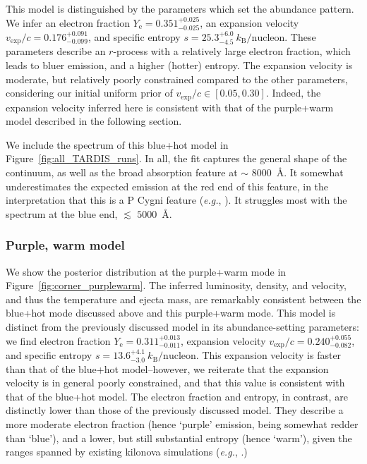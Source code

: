 \documentclass[twocolumn, twocolappendix]{aastex63}
\def\eg{{\it e.g.}}
\begin{document}
This model is distinguished by the parameters which set the abundance pattern. We infer an electron fraction $Y_{\mathrm{e}} = 0.351^{+0.025}_{-0.025}$, an expansion velocity $v_{\mathrm{exp}}/c = 0.176^{+0.091}_{-0.099}$, and specific entropy $s = 25.3^{+6.0}_{-4.5}~k_{\mathrm{B}}/\mathrm{nucleon}$. These parameters describe an $r$-process with a relatively large electron fraction, which leads to bluer emission, and a higher (hotter) entropy. The expansion velocity is moderate, but relatively poorly constrained compared to the other parameters, considering our initial uniform prior of $v_{\mathrm{exp}}/c \in [0.05, 0.30]$. Indeed, the expansion velocity inferred here is consistent with that of the purple+warm model described in the following section.

We include the spectrum of this blue+hot model in Figure~\ref{fig:all_TARDIS_runs}. In all, the fit captures the general shape of the continuum, as well as the broad absorption feature at $\sim$ $8000$~\AA. It somewhat underestimates the expected emission at the red end of this feature, in the interpretation that this is a P Cygni feature (\eg, \citealt{watson19}). It struggles most with the spectrum at the blue end, $\lesssim$ $ 5000$~\AA.


\subsubsection{Purple, warm model}\label{sssc:purplewarm}

We show the posterior distribution at the purple+warm mode in Figure~\ref{fig:corner_purplewarm}. The inferred luminosity, density, and velocity, and thus the temperature and ejecta mass, are remarkably consistent between the blue+hot mode discussed above and this purple+warm mode. This model is distinct from the previously discussed model in its abundance-setting parameters: we find electron fraction $Y_{\mathrm{e}} = 0.311^{+0.013}_{-0.011}$, expansion velocity $v_{\mathrm{exp}}/c = 0.240^{+0.055}_{-0.082}$, and specific entropy $s = 13.6^{+4.1}_{-3.0}~k_{\mathrm{B}}/\mathrm{nucleon}$. This expansion velocity is faster than that of the blue+hot model--however, we reiterate that the expansion velocity is in general poorly constrained, and that this value is consistent with that of the blue+hot model. The electron fraction and entropy, in contrast, are distinctly lower than those of the previously discussed model. They describe a more moderate electron fraction (hence `purple' emission, being somewhat redder than `blue'), and a lower, but still substantial entropy (hence `warm'), given the ranges spanned by existing kilonova simulations (\eg, \citealt{kawaguchi20}.)  
\end{document}
